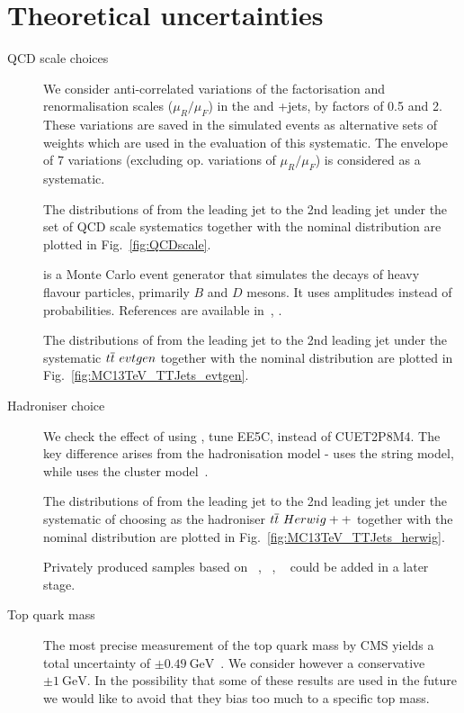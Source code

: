 \section{Theoretical uncertainties}
\begin{description}

\item[QCD scale choices]
  We consider anti-correlated variations of the factorisation and renormalisation scales ($\mu_R/\mu_F$) in the \ttbar and \PW+jets, by factors of 0.5 and 2. These variations are saved in the simulated events as alternative sets of weights which are used in the evaluation of this systematic. The envelope of 7 variations (excluding op. variations of $\mu_R/\mu_F$) is considered as a systematic.

The distributions of \pullangle from the leading jet \leadingjet to the 2nd leading jet \scndleadingjet under the set of QCD scale systematics together with the nominal distribution are plotted in Fig.~\ref{fig:QCDscale}.

\item[\EVTGEN] \EVTGEN is a Monte Carlo event generator that simulates the decays of heavy flavour particles, primarily $B$ and $D$ mesons. It uses amplitudes instead of probabilities. References are available in~\cite{evtgen}, \cite{Lange:2001uf}.

The distributions of \pullangle from the leading jet \leadingjet to the 2nd leading jet \scndleadingjet under the \EVTGEN systematic $t\overline{t}\ evtgen$ together with the nominal distribution are plotted in Fig.~\ref{fig:MC13TeV_TTJets_evtgen}.

\item[Hadroniser choice] We check the effect of using \HERWIGpp \cite{Bahr:2008pv}, tune EE5C\cite{Seymour:2013qka}, instead of  CUET2P8M4. The key difference arises from the hadronisation model - \PYTHIA uses the string model, while \HERWIGpp uses the cluster model~\cite{Sjostrand:hadronisation}. 

The distributions of \pullangle from the leading jet \leadingjet to the 2nd leading jet \scndleadingjet under the systematic of choosing \HERWIGpp as the hadroniser $t\overline{t}\ Herwig++$ together with the nominal distribution are plotted in Fig.~\ref{fig:MC13TeV_TTJets_herwig}.

Privately produced samples based on \SHERPA~\cite{Gleisberg:2008ta}, \DIRE~\cite{Hoche:2015sya}, ~\cite{Bellm:2015jjp} could be added in a later stage.

\item[Top quark mass] The most precise measurement of the top quark mass by CMS yields a total uncertainty of $\pm0.49~\text{GeV}$~\cite{Khachatryan:2015hba}. We consider however a conservative $\pm1~\text{GeV}$. In the possibility that some of these results are used in the future we would like to avoid that they bias too much to a specific top mass.


\end{description}
